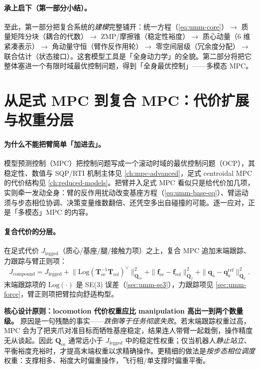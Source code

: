 \paragraph{承上启下（第一部分小结）。}
至此，第一部分把复合系统的\emph{建模}完整铺开：统一方程（\cref{eq:umm-core}）$\to$ 质量矩阵分块（耦合的代数）$\to$ ZMP/摩擦锥（稳定性裕度）$\to$ 质心动量（$6$ 维紧凑表示）$\to$ 角动量守恒（臂作反作用轮）$\to$ 零空间层级（冗余度分配）$\to$ 联合估计（状态接口）。这套模型工具是「全身动力学」的全貌。第二部分将把它整体塞进一个有限时域最优控制问题，得到「全身最优控制」——多模态 MPC。

\section{从足式 MPC 到复合 MPC：代价扩展与权重分层}
\label{sec:umm-cost}

\paragraph{为什么不能把臂简单「加进去」。}
模型预测控制（MPC）把控制问题写成一个滚动时域的最优控制问题（OCP），其稳定性、数值与 SQP/RTI 机制主体见 \cref{ch:mpc-advanced}，足式 centroidal MPC 的代价结构见 \cref{ch:reduced-models}。把臂并入足式 MPC 看似只是给代价加几项，实则牵一发动全身：臂的反作用扰动改变基座方程（\cref{eq:umm-base-eq}）、臂运动须与步态相位协调、决策变量维数翻倍、还凭空多出自碰撞的可能。逐一应对，正是「多模态」MPC 的内容。

\paragraph{复合代价的分层。}
在足式代价 $J_{\text{legged}}$（质心/基座/腿/接触力项）之上，复合 MPC 追加末端跟踪、力跟踪与臂正则项：
\begin{equation}
  J_{\text{compound}}=J_{\text{legged}}
  +\big\|\mathrm{Log}(\mathbf T_{\text{ee}}^{-1}\mathbf T_{\text{ref}})^{\vee}\big\|_{\mathbf Q_{\text{ee}}}^2
  +\|\mathbf f_{\text{ee}}-\mathbf f_{\text{ref}}\|_{\mathbf Q_f}^2
  +\|\mathbf q_a-\mathbf q_a^{\text{ref}}\|_{\mathbf Q_a}^2.
  \label{eq:umm-Jcompound}
\end{equation}
末端跟踪项的 $\mathrm{Log}(\cdot)$ 是 SE(3) 误差（\cref{sec:umm-se3}），力跟踪项见 \cref{sec:umm-force}，臂正则项把臂拉向舒适构型。

\begin{insight}
\textbf{核心设计原则：locomotion 代价权重应比 manipulation 高出一到两个数量级。}\;
原因是一句残酷的事实——\emph{跌倒等于任务彻底失败}。若末端跟踪权重过高，MPC 会为了把夹爪对准目标而牺牲基座稳定，结果连人带臂一起栽倒，操作精度无从谈起。因此 $\mathbf Q_{\text{ee}}$ 通常远小于 $J_{\text{legged}}$ 中的稳定性权重；仅当机器人\emph{静止站立}、平衡裕度充裕时，才提高末端权重以求精确操作。更精细的做法是\emph{按步态相位调度}权重：支撑相多、裕度大时偏重操作，飞行相/单支撑时偏重平衡。
\end{insight}

